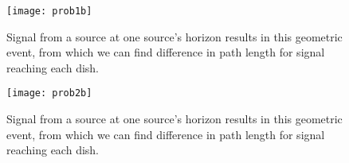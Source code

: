 \documentclass[12pt]{article}
\begin{document}
\begin{onehalfspacing}
\begin{figure}
    \centering
    \begin{minipage}{0.48\textwidth}
        \centering
        \texttt{[image: prob1b]} %
        \caption{Signal from a source at one source's horizon results in this geometric event, from which we can find difference in path length for signal reaching each dish.}
    \end{minipage}\hfill
    \begin{minipage}{0.48\textwidth}
        \centering
        \texttt{[image: prob2b]} %
        \caption{Signal from a source at one source's horizon results in this geometric event, from which we can find difference in path length for signal reaching each dish.}
    \end{minipage}
\end{figure}






\bigskip
\bigskip
\end{onehalfspacing}
\end{document}
